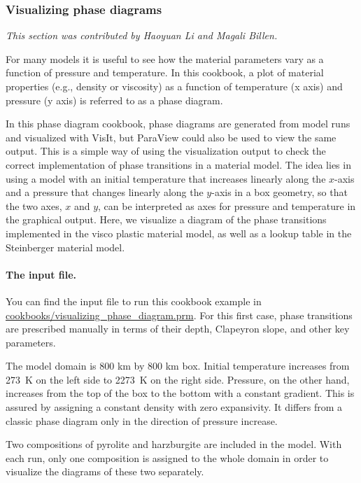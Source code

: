 \subsubsection{Visualizing phase diagrams}
\label{sec:visualizing-phase-diagram}
\textit{This section was contributed by Haoyuan Li and Magali Billen.}

For many models it is useful to see how the material parameters vary as a function of pressure and temperature. In this cookbook, a plot of material properties (e.g., density or viscosity) as a function of temperature (x axis) and pressure (y axis) is referred to as a phase diagram. 

In this phase diagram cookbook, phase diagrams are generated from model runs and visualized with VisIt, but ParaView could also be used to view the same output. %
This is a simple way of using the visualization output to check the correct implementation of phase transitions in a material model. 
The idea lies in using a model with an initial temperature that increases linearly along the $x$-axis and a pressure that changes linearly along the $y$-axis in a box geometry, so that the two axes, $x$ and $y$, can be interpreted as axes for pressure and temperature in the graphical output. 
Here, we visualize a diagram of the phase transitions implemented in the visco plastic material model, as well as a lookup table in the Steinberger material model. 

\paragraph{The input file.}
You can find the input file to run this cookbook example in \url{cookbooks/visualizing_phase_diagram.prm}. For this first case, phase transitions are prescribed manually in terms of their depth, Clapeyron slope, and other key parameters. 

The model domain is  800 km  by 800 km box. %
Initial temperature increases from \SI{273}{K} on the left side to \SI{2273}{K} on the right side. %
Pressure, on the other hand, increases from the top of the box to the bottom with a constant gradient.
This is assured by assigning a constant density with zero expansivity.
It differs from a classic phase diagram only in the direction of pressure increase.

Two compositions of pyrolite and harzburgite are included in the model. %
With each run, only one composition is assigned to the whole domain in order to visualize the diagrams of these two separately.

